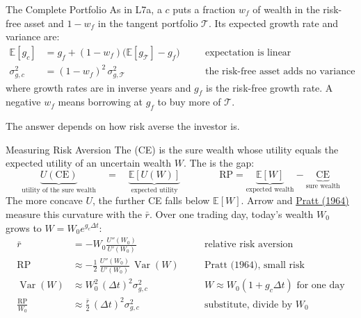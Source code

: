 \documentclass[aspectratio=169,11pt]{beamer}
\newcommand{\E}{\mathbb{E}}
\newcommand{\Var}{\operatorname{Var}}
\newcommand{\Tan}{\mathcal{T}}
\newcommand{\CE}{\mathrm{CE}}
\newcommand{\RP}{\mathrm{RP}}
\begin{document}
\begin{frame}{The Complete Portfolio}
  As in L7a, a  $c$ puts a fraction $w_f$ of wealth in the risk-free
  asset and $1-w_f$ in the tangent portfolio $\Tan$. Its expected growth rate and
  variance are:
  \[
    \begin{aligned}
      \E[g_c]&=g_f+(1-w_f)\bigl(\E[g_{\Tan}]-g_f\bigr) &&\quad\text{expectation is linear}\\
      \sigma^2_{g,c}&=(1-w_f)^2\,\sigma^2_{g,\Tan} &&\quad\text{the risk-free asset adds no variance}
    \end{aligned}
  \]
  where growth rates are in inverse years and $g_f$ is the risk-free growth rate.
  A negative $w_f$ means borrowing at $g_f$ to buy more of $\Tan$.

  \vspace{0.8em}
  \textbf{} The answer depends on how
  risk averse the investor is.
\end{frame}

\begin{frame}{Measuring Risk Aversion}
  \setlength{\jot}{0pt}
  \setlength{\abovedisplayskip}{2pt}\setlength{\belowdisplayskip}{1pt}
  The  (CE) is the sure wealth whose utility equals the
  expected utility of an uncertain wealth $W$. The  is the gap:
  \[
    \boxed{\underbrace{U(\CE)}_{\text{utility of the sure wealth}}\quad=\quad\underbrace{\E[U(W)]}_{\text{expected utility}}
    \qquad\qquad
    \RP=\underbrace{\E[W]}_{\text{expected wealth}}-\underbrace{\CE}_{\text{sure wealth}}}
  \]
  The more concave $U$, the further CE falls below $\E[W]$. Arrow and
  \href{https://doi.org/10.2307/1913738}{Pratt (1964)} measure this curvature with the
   $\bar r$. Over one trading day, today's wealth
  $W_0$ grows to $W=W_0e^{g_c\Delta t}$:
  {\small
  \[
    \begin{aligned}
      \bar r&=-W_0\frac{U''(W_0)}{U'(W_0)} &&\quad\text{relative risk aversion}\\
      \RP&\approx-\frac12\,\frac{U''(W_0)}{U'(W_0)}\,\Var(W) &&\quad\text{Pratt (1964), small risk}\\
      \Var(W)&\approx W_0^2\,(\Delta t)^2\sigma^2_{g,c} &&\quad W\approx W_0(1+g_c\Delta t)\text{ for one day}\\
      \frac{\RP}{W_0}&\approx\frac{\bar r}{2}\,(\Delta t)^2\sigma^2_{g,c} &&\quad\text{substitute, divide by }W_0
    \end{aligned}
  \]
  }
\end{frame}
\end{document}
